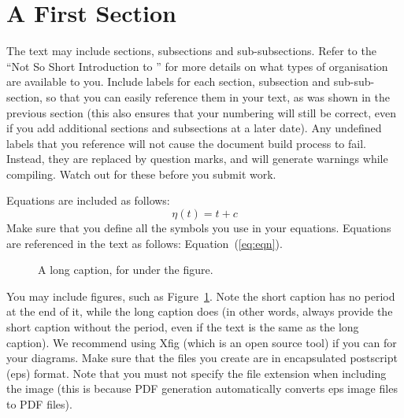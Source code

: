 
\section{A First Section}
\label{sec:first:first_sec}

The text may include sections, subsections and sub-subsections. Refer to the ``Not So Short Introduction to \LaTeXe'' for more details on what types of organisation are available to you. Include labels for each section, subsection and sub-sub-section, so that you can easily reference them in your text, as was shown in the previous section (this also ensures that your numbering will still be correct, even if you add additional sections and subsections at a later date). Any undefined labels that you reference will not cause the document build process to fail. Instead, they are replaced by question marks, and will generate warnings while compiling. Watch out for these before you submit work.

Equations are included as follows:
\begin{equation}
\label{eq:eqn}
	\eta(t)=t+c
\end{equation}
Make sure that you define all the symbols you use in your equations. Equations are referenced in the text as follows: Equation~(\ref{eq:eqn}).

\begin{figure}
	\caption[A short caption, for the figure list]{A long caption, for under the figure.}
	\label{fig:fig1}
\end{figure}
You may include figures, such as Figure~\ref{fig:fig1}. Note the short caption has no period at the end of it, while the long caption does (in other words, always provide the short caption without the period, even if the text is the same as the long caption). We recommend using Xfig (which is an open source tool) if you can for your diagrams. Make sure that the files you create are in encapsulated postscript (eps) format. Note that you must not specify the file extension when including the image (this is because PDF generation automatically converts eps image files to PDF files).

